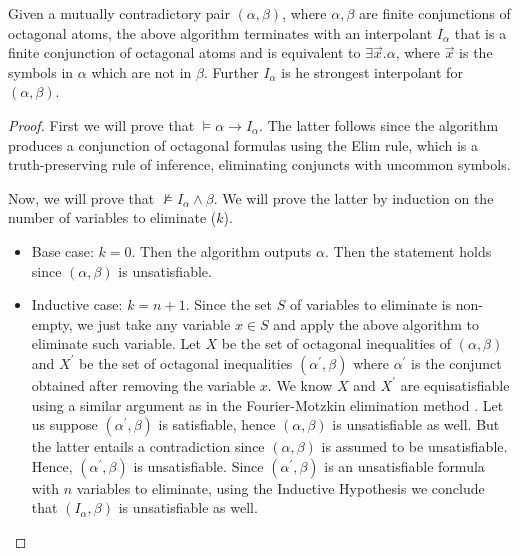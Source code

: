 \begin{theorem}
  Given a mutually contradictory pair $(\alpha, \beta)$,
  where $\alpha, \beta$ are finite conjunctions of octagonal
  atoms, the above algorithm terminates with an interpolant
  $I_\alpha$ that is a finite conjunction of octagonal atoms
  and is equivalent to $\exists \vec{x}. \alpha$, where
  $\vec{x}$ is the symbols in $\alpha$ which are not in
  $\beta$. Further $I_\alpha$ is he strongest interpolant
  for $(\alpha, \beta)$.
\end{theorem}

\begin{proof}
  First we will prove that $\models \alpha \rightarrow I_\alpha$.
  The latter follows since the algorithm produces a
  conjunction of octagonal formulas using the Elim rule,
  which is a truth-preserving rule of inference, eliminating
  conjuncts with uncommon symbols.
  
  Now, we will prove that $\not\models I_\alpha \land \beta$. We
  will prove the latter by induction on the number of variables
  to eliminate ($k$).

  \begin{itemize}
  \item Base case: $k = 0$. Then the algorithm outputs $\alpha$.
    Then the statement holds since $(\alpha, \beta)$
    is unsatisfiable.
  \item Inductive case: $k = n + 1$. Since the set $S$ of variables to eliminate
    is non-empty, we just take any variable $x \in S$ and apply the
    above algorithm to eliminate such variable.
    Let $X$ be the set of octagonal inequalities of $(\alpha, \beta)$
    and $X^{'}$ be the set of octagonal inequalities $(\alpha^{'}, \beta)$
    where $\alpha^{'}$ is the conjunct obtained after removing the
    variable $x$. We know $X$ and $X^{'}$ are equisatisfiable using
    a similar argument as in the Fourier-Motzkin elimination
    method \cite{Schrijver:1986:TLI:17634}. Let us suppose
    $(\alpha^{'}, \beta)$ is satisfiable, hence $(\alpha, \beta)$
    is unsatisfiable as well. But the latter entails a contradiction
    since $(\alpha, \beta)$ is assumed to be unsatisfiable. Hence,
    $(\alpha^{'}, \beta)$ is unsatisfiable. Since $(\alpha^{'}, \beta)$
    is an unsatisfiable formula with $n$ variables to eliminate,
    using the Inductive Hypothesis we conclude that $(I_\alpha, \beta)$
    is unsatisfiable as well.
  \end{itemize}
  
\end{proof}

